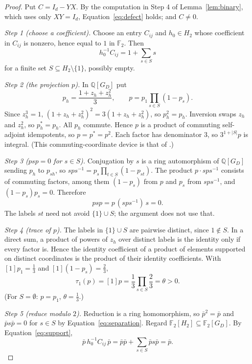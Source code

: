 \documentclass[11pt]{article}
\theoremstyle{remark}
\numberwithin{equation}{section}
\newcommand{\F}{\mathbb F}
\newcommand{\Q}{\mathbb Q}
\begin{document}
\begin{proof}
Put $C=I_d-YX$. By the computation in Step 4 of Lemma~\ref{lem:binary}, which uses only $XY=I_d$, Equation~\eqref{eq:defect} holds; and $C\neq 0$.

\emph{Step 1 (choose a coefficient).} Choose an entry $C_{ij}$ and $h_0\in H_2$ whose coefficient in $C_{ij}$ is nonzero, hence equal to $1$ in $\F_2$. Then
\begin{equation}\label{eq:support}
 h_0^{-1}C_{ij}=1+\sum_{s\in S}s
\end{equation}
for a finite set $S\subseteq H_2\setminus\{1\}$, possibly empty.

\emph{Step 2 (the projection $p$).} In $\Q[G_D]$ put
\[
 p_h=\frac{1+z_h+z_h^2}{3},\qquad
 p=p_1\prod_{s\in S}(1-p_s).
\]
Since $z_h^3=1$, $(1+z_h+z_h^2)^2=3(1+z_h+z_h^2)$, so $p_h^2=p_h$. Inversion swaps $z_h$ and $z_h^2$, so $p_h^*=p_h$. All $p_h$ commute. Hence $p$ is a product of commuting self-adjoint idempotents, so $p=p^*=p^2$. Each factor has denominator $3$, so $3^{1+|S|}p$ is integral. (This commuting-coordinate device is that of \cite[Lemmas 3.1 and 3.4]{DicksSchick2002}.)

\emph{Step 3 ($psp=0$ for $s\in S$).} Conjugation by $s$ is a ring automorphism of $\Q[G_D]$ sending $p_h$ to $p_{sh}$, so $sps^{-1}=p_s\prod_{t\in S}(1-p_{st})$. The product $p\cdot sps^{-1}$ consists of commuting factors, among them $(1-p_s)$ from $p$ and $p_s$ from $sps^{-1}$, and $(1-p_s)p_s=0$. Therefore
\begin{equation}\label{eq:separation}
 psp=p\,(sps^{-1})\,s=0.
\end{equation}
The labels $st$ need not avoid $\{1\}\cup S$; the argument does not use that.

\emph{Step 4 (trace of $p$).} The labels in $\{1\}\cup S$ are pairwise distinct, since $1\notin S$. In a direct sum, a product of powers of $z_h$ over distinct labels is the identity only if every factor is. Hence the identity coefficient of a product of elements supported on distinct coordinates is the product of their identity coefficients. With $[1]p_1=\frac13$ and $[1](1-p_s)=\frac23$,
\begin{equation}\label{eq:theta}
 \tau_1(p)=[1]p=\frac13\prod_{s\in S}\frac23=\theta>0.
\end{equation}
(For $S=\emptyset$: $p=p_1$, $\theta=\frac13$.)

\emph{Step 5 (reduce modulo $2$).} Reduction is a ring homomorphism, so $\bar p^2=\bar p$ and $\bar ps\bar p=0$ for $s\in S$ by Equation~\eqref{eq:separation}. Regard $\F_2[H_2]\subseteq\F_2[G_D]$. By Equation~\eqref{eq:support},
\[
 \bar p\,h_0^{-1}C_{ij}\,\bar p=\bar p\bar p+\sum_{s\in S}\bar ps\bar p=\bar p.
\]


\end{proof}
\end{document}
